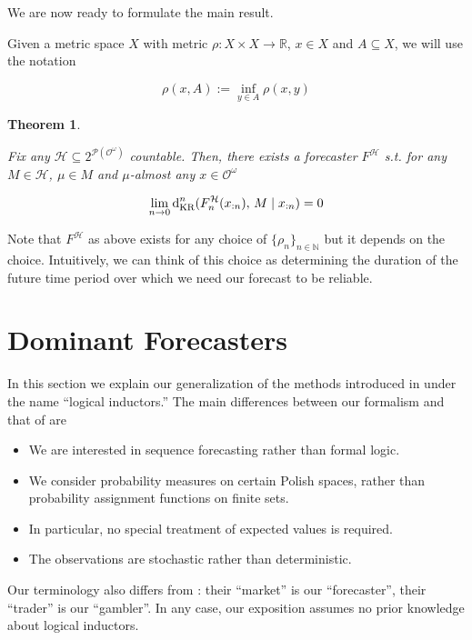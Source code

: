 \documentclass[11pt]{article}
\theoremstyle{definition}
\theoremstyle{plain}
\newtheorem{theorem}{Theorem}%
\newcommand{\Nats}{\mathbb{N}}
\newcommand{\Reals}{\mathbb{R}}
\newcommand{\Sq}[2]{\{#1\}_{#2 \in \Nats}}
\newcommand{\Sqn}[1]{\Sq{#1}{n}}
\newcommand{\PM}{\mathcal{P}}
\newcommand{\DKR}{\operatorname{d}_{\textnormal{KR}}}
\newcommand{\Ob}{\mathcal{O}}
\newcommand{\OO}{\Ob^\omega}
\newcommand{\PMO}{\PM(\OO)}
\newcommand{\MC}{\mathcal{H}}
\begin{document}
We are now ready to formulate the main result.

Given a metric space $X$ with metric $\rho: X \times X \rightarrow \Reals$, $x \in X$ and $A \subseteq X$, we will use the notation

\begin{equation}
\rho(x,A):=\inf_{y \in A} \rho(x,y)
\end{equation}

\begin{theorem}
\label{thm:main}

Fix any $\MC \subseteq 2^{\PMO}$ countable. Then, there exists a forecaster $F^\MC$ s.t. for any $M \in \MC$, $\mu \in M$ and $\mu$-almost any $x \in \OO$

\begin{equation}
\label{eqn:thm_main}
\lim_{n \rightarrow 0} \DKR^n(F^\MC_n(x_{:n}),\, M \mid x_{:n}) = 0
\end{equation}

\end{theorem}

Note that $F^\MC$ as above exists for any choice of $\Sqn{\rho_n}$ but it depends on the choice. Intuitively, we can think of this choice as determining the duration of the future time period over which we need our forecast to be reliable.

\section{Dominant Forecasters}
\label{sec:garrabrant}

In this section we explain our generalization of the methods introduced in \cite{Garrabrant_2016} under the name \enquote{logical inductors.} The main differences between our formalism and that of \cite{Garrabrant_2016} are

\begin{itemize}
\item 
We are interested in sequence forecasting rather than formal logic.
\item
We consider probability measures on certain Polish spaces, rather than probability assignment functions on finite sets.
\item
In particular, no special treatment of expected values is required.
\item
The observations are stochastic rather than deterministic.
\end{itemize}

Our terminology also differs from \cite{Garrabrant_2016}: their \enquote{market} is our \enquote{forecaster}, their \enquote{trader} is our \enquote{gambler}. In any case, our exposition assumes no prior knowledge about logical inductors.
\end{document}
